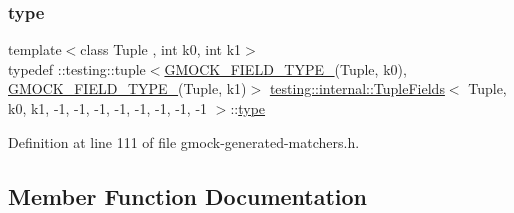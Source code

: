 \subsubsection{\texorpdfstring{type}{type}}
{\footnotesize\ttfamily template$<$class Tuple , int k0, int k1$>$ \\
typedef \+::testing\+::tuple$<$\hyperlink{gmock-generated-matchers_8h_acf3e27de83a73f0d873da1cd471e505b}{G\+M\+O\+C\+K\+\_\+\+F\+I\+E\+L\+D\+\_\+\+T\+Y\+P\+E\+\_\+}(Tuple, k0), \hyperlink{gmock-generated-matchers_8h_acf3e27de83a73f0d873da1cd471e505b}{G\+M\+O\+C\+K\+\_\+\+F\+I\+E\+L\+D\+\_\+\+T\+Y\+P\+E\+\_\+}(Tuple, k1)$>$ \hyperlink{classtesting_1_1internal_1_1TupleFields}{testing\+::internal\+::\+Tuple\+Fields}$<$ Tuple, k0, k1, -\/1, -\/1, -\/1, -\/1, -\/1, -\/1, -\/1, -\/1 $>$\+::\hyperlink{classtesting_1_1internal_1_1TupleFields_3_01Tuple_00_01k0_00_01k1_00_01-1_00_01-1_00_01-1_00_01-fb5812c507091ce72ac353453b83394d_ad0dd4e84d48ec9a5ef262cf32f6979f9}{type}}



Definition at line 111 of file gmock-\/generated-\/matchers.\+h.



\subsection{Member Function Documentation}
\mbox{\label{classtesting_1_1internal_1_1TupleFields_3_01Tuple_00_01k0_00_01k1_00_01-1_00_01-1_00_01-1_00_01-fb5812c507091ce72ac353453b83394d_aff1691053cc880fe84f27cb6a1c5680f}} 
